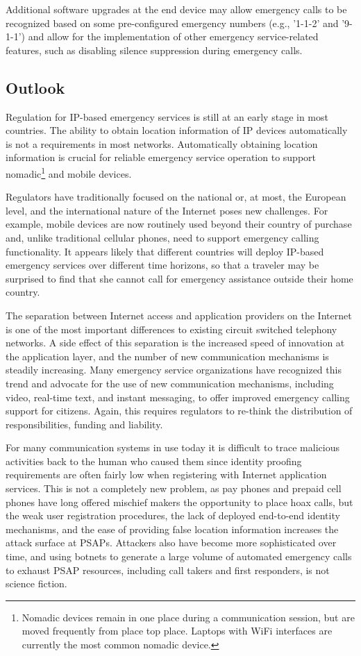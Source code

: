\documentclass[12pt]{article}
\begin{document}
Additional software upgrades at the end device may allow emergency calls to be recognized based on some pre-configured emergency numbers (e.g., '1-1-2' and '9-1-1') and allow for the implementation of other emergency service-related features, such as disabling silence suppression during emergency calls. 

\subsection{Outlook}

Regulation for IP-based emergency services is still at an early stage in most countries. The ability to obtain location information of IP devices automatically is not a requirements in most networks. Automatically obtaining location information is crucial for reliable emergency service operation to support nomadic\footnote{Nomadic devices remain in one place during a communication session, but are moved frequently from place top place. Laptops with WiFi interfaces are currently the most common nomadic device.} and mobile devices.

Regulators have traditionally focused on the national or, at most, the European level, and the international nature of the Internet poses new challenges. For example, mobile devices are now routinely used beyond their country of purchase and, unlike traditional cellular phones, need to support emergency calling functionality. It appears likely that different countries will deploy IP-based emergency services over different time horizons, so that a traveler may be surprised to find that she cannot call for emergency assistance outside their home country.

The separation between Internet access and application providers on the Internet is one of the most important differences to existing circuit switched telephony networks. A side effect of this separation is the increased speed of innovation at the application layer, and the number of new communication mechanisms is steadily increasing. Many emergency service organizations have recognized this trend and advocate for the use of new communication mechanisms, including video, real-time text, and instant messaging, to offer improved emergency calling support for citizens. Again, this requires regulators to re-think the distribution of responsibilities, funding and liability.

For many communication systems in use today it is difficult to trace malicious activities back to the human who caused them since identity proofing requirements are often fairly low when registering with Internet application services. This is not a completely new problem, as pay phones and prepaid cell phones have long offered mischief makers the opportunity to place hoax calls, but the weak user registration procedures, the lack of deployed end-to-end identity mechanisms, and the ease of providing false location information increases the attack surface at PSAPs. Attackers also have become more sophisticated over time, and using botnets to generate a large volume of automated emergency calls to exhaust PSAP resources, including call takers and first responders, is not science fiction. 
\end{document}
